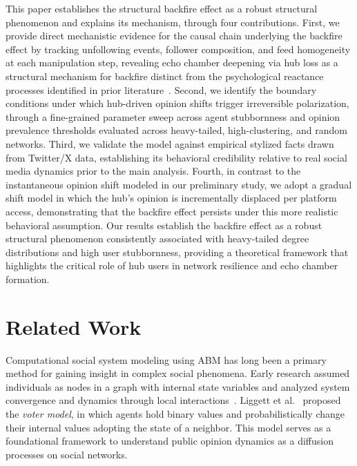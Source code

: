 \documentclass[pdflatex,sn-mathphys-num]{sn-jnl}%
\theoremstyle{thmstyleone}%
\theoremstyle{thmstyletwo}%
\theoremstyle{thmstylethree}%
\def\Black{\color[rgb]{0,0,0}}
\begin{document}
This paper establishes the structural backfire effect as a robust structural phenomenon and explains its mechanism, through four contributions.
First, we provide direct mechanistic evidence for the causal chain underlying the backfire
effect by tracking unfollowing events, follower composition, and feed homogeneity at each
manipulation step, revealing echo chamber deepening via hub loss as a structural mechanism for backfire
distinct from the psychological reactance processes identified in prior literature~\cite{Bail2018}.
Second, we identify the boundary conditions under which hub-driven opinion shifts trigger irreversible
polarization, through a fine-grained parameter sweep across agent stubbornness and
opinion prevalence thresholds evaluated across heavy-tailed, high-clustering, and random networks.
Third, we validate the model against empirical stylized facts drawn from Twitter/X data,
establishing its behavioral credibility relative to real social media dynamics prior to the main analysis.
Fourth, in contrast to the instantaneous opinion shift modeled in our preliminary study,
we adopt a gradual shift model in which the hub's opinion is incrementally displaced
per platform access, demonstrating that the backfire effect persists under this
more realistic behavioral assumption.
Our results establish the backfire effect as a robust structural phenomenon consistently
associated with heavy-tailed degree distributions and high user stubbornness,
providing a theoretical framework that highlights the
critical role of hub users in network resilience and echo chamber formation.
\Black


\section{Related Work}\label{RelatedWork}
Computational social system modeling using ABM has long been a
primary method for gaining insight 
in complex social phenomena. Early research assumed individuals
as nodes in a graph with internal state variables and analyzed system
convergence and dynamics through local interactions~\cite{Clifford1973,Liggett1975,Axelrod1997,Sznajd2005,Galam2008}. 
Liggett et al.~\cite{Liggett1975} proposed the \emph{voter model}, in which agents
hold binary values and probabilistically change their internal values
adopting the state of a neighbor. This model serves as a foundational
framework to understand public opinion dynamics as a diffusion
processes on social networks.
\par
\end{document}
